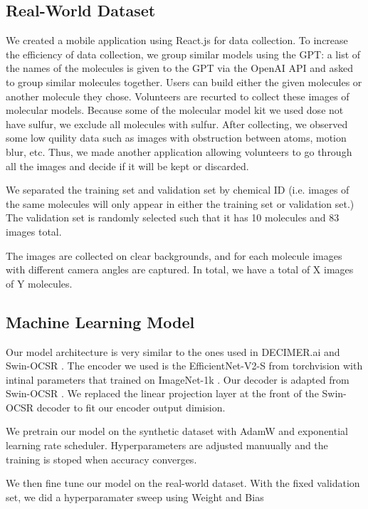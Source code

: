 \documentclass{article}
\begin{document}
\subsection{Real-World Dataset}
We created a mobile application using React.js for data collection. To increase the efficiency of data collection, we group similar models using the GPT: a list of the names of the molecules is given to the GPT via the OpenAI API and asked to group similar molecules together. Users can build either the given molecules or another molecule they chose. Volunteers are recurted to collect these images of molecular models. Because some of the molecular model kit we used dose not have sulfur, we exclude all molecules with sulfur. After collecting, we observed some low quility data such as images with obstruction between atoms, motion blur, etc. Thus, we made another application allowing volunteers to go through all the images and decide if it will be kept or discarded.

We separated the training set and validation set by chemical ID (i.e. images of the same molecules will only appear in either the training set or validation set.) The validation set is randomly selected such that it has 10 molecules and 83 images total. 

The images are collected on clear backgrounds, and for each molecule images with different camera angles are captured. In total, we have a total of X images of Y molecules.  

\subsection{Machine Learning Model}
Our model architecture is very similar to the ones used in DECIMER.ai \autocite{decimer} and Swin-OCSR \autocite{swinocsr}. The encoder we used is the EfficientNet-V2-S \autocite{effv2} from torchvision \autocite{torchvision2016} with intinal parameters that trained on ImageNet-1k \autocite{imagenet}. Our decoder is adapted from Swin-OCSR \autocite{swinocsr}. We replaced the linear projection layer at the front of the Swin-OCSR decoder to fit our encoder output dimision. 

We pretrain our model on the synthetic dataset with AdamW \cite{adamw} and exponential learning rate scheduler. Hyperparameters are adjusted manuually and the training is stoped when accuracy converges. 

We then fine tune our model on the real-world dataset. With the fixed validation set, we did a hyperparamater sweep using Weight and Bias \autocite{wandb}
\end{document}
